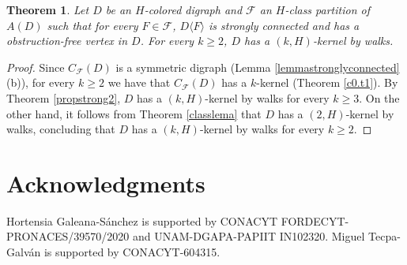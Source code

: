 \documentclass[10pt,a4paper]{article}
\newtheorem{theorem}{Theorem}[section]
\begin{document}
\begin{theorem}
\label{teostrong2}
Let $D$ be an $H$-colored digraph and $\mathscr{F}$ an $H$-class partition of $A(D)$ such that for every $F \in \mathscr{F}$, $D \langle F \rangle$ is strongly connected and has a obstruction-free vertex in $D$. For every $k \geq 2$, $D$ has a $(k,H)$-kernel by walks.
\end{theorem}
\begin{proof}
Since $C_{\mathscr{F}}(D)$ is a symmetric digraph (Lemma \ref{lemmastronglyconnected} (b)), for every $k \geq 2$ we have that $C_{\mathscr{F}}(D)$ has a $k$-kernel (Theorem \ref{c0.t1}). By Theorem \ref{propstrong2}, $D$ has a $(k, H)$-kernel by walks for every $k \geq 3$. On the other hand, it follows from Theorem \ref{classlema} that $D$ has a $(2,H)$-kernel by walks, concluding that $D$ has a $(k,H)$-kernel by walks for every $k \geq 2$.
\end{proof}



\section*{Acknowledgments}
Hortensia Galeana-Sánchez is supported by CONACYT FORDECYT-PRONACES/39570/2020 
and UNAM-DGAPA-PAPIIT IN102320. Miguel Tecpa-Galván is supported by
CONACYT-604315.
\end{document}
